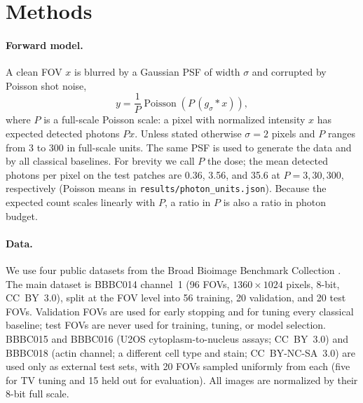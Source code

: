 \documentclass[preprint,12pt]{elsarticle}
\begin{document}
\section{Methods}
\paragraph{Forward model.}
A clean FOV $x$ is blurred by a Gaussian PSF of width $\sigma$ and corrupted by
Poisson shot noise,
\begin{equation}
y = \frac{1}{P}\operatorname{Poisson}\!\left(P\,(g_\sigma * x)\right),
\label{eq:forward}
\end{equation}
where $P$ is a full-scale Poisson scale: a pixel with normalized intensity $x$
has expected detected photons $Px$. Unless stated otherwise $\sigma=2$ pixels
and $P$ ranges from 3 to 300 in full-scale units. The same PSF is used to generate the
data and by all classical baselines. For brevity we call $P$ the dose; the
mean detected photons per pixel on the test patches are 0.36, 3.56, and 35.6
at $P=3,30,300$, respectively (Poisson means in
\texttt{results/photon\_units.json}). Because the expected count scales
linearly with $P$, a ratio in $P$ is also a ratio in photon budget.

\paragraph{Data.}
We use four public datasets from the Broad Bioimage Benchmark Collection
\cite{ljosa2012bbbc}. The main dataset is BBBC014 channel~1 (96 FOVs,
$1360\times1024$ pixels, 8-bit, CC~BY~3.0), split at the FOV level into 56
training, 20 validation, and 20 test FOVs. Validation FOVs are used for early
stopping and for tuning every classical baseline; test FOVs are never used for
training, tuning, or model selection. BBBC015 and BBBC016 (U2OS
cytoplasm-to-nucleus assays; CC~BY~3.0) and BBBC018 (actin channel; a different
cell type and stain; CC~BY-NC-SA~3.0) are used only as external test sets, with
20 FOVs sampled uniformly from each (five for TV tuning and 15 held out for evaluation). All images are normalized by their 8-bit full scale.
\end{document}
